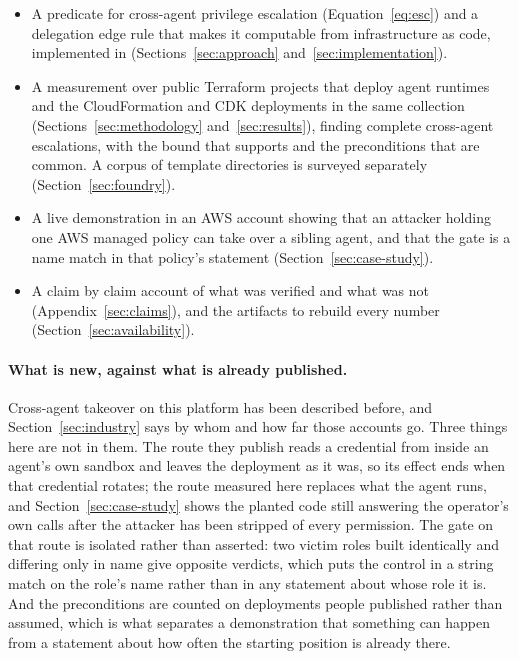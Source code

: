 \begin{itemize}
\item A predicate for cross-agent privilege escalation
  (Equation~\ref{eq:esc}) and a delegation edge rule that makes it computable
  from infrastructure as code, implemented in \tool
  (Sections~\ref{sec:approach} and~\ref{sec:implementation}).
\item A measurement over \nProjects public Terraform projects that deploy
  agent runtimes and the CloudFormation and CDK deployments in the same
  collection (Sections~\ref{sec:methodology} and~\ref{sec:results}), finding
  \nChainsFound complete cross-agent escalations, with the bound that supports
  and the preconditions that are common. A \foundry corpus of \nFoundryDirs
  template directories is surveyed separately
  (Section~\ref{sec:foundry}).
\item A live demonstration in an AWS account showing that an attacker holding
  one AWS managed policy can take over a sibling agent, and that the gate is a
  name match in that policy's  statement
  (Section~\ref{sec:case-study}).
\item A claim by claim account of what was verified and what was not
  (Appendix~\ref{sec:claims}), and the artifacts to rebuild every number
  (Section~\ref{sec:availability}).
\end{itemize}

\paragraph{What is new, against what is already published.}
Cross-agent takeover on this platform has been described before, and
Section~\ref{sec:industry} says by whom and how far those accounts go. Three
things here are not in them. The route they publish reads a credential from
inside an agent's own sandbox and leaves the deployment as it was, so its
effect ends when that credential rotates; the route measured here replaces
what the agent runs, and Section~\ref{sec:case-study} shows the planted code
still answering the operator's own calls after the attacker has been stripped
of every permission. The gate on that route is isolated rather than asserted:
two victim roles built identically and differing only in name give opposite
verdicts, which puts the control in a string match on the role's name rather
than in any statement about whose role it is. And the preconditions are
counted on deployments people published rather than assumed, which is what
separates a demonstration that something can happen from a statement about
how often the starting position is already there.

